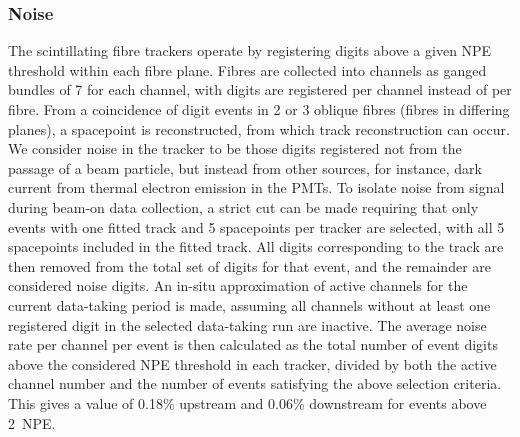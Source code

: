 \subsubsection{Noise}
The scintillating fibre trackers operate by registering digits above a given NPE threshold within each fibre plane. Fibres are collected into channels as ganged bundles of 7 for each channel, with digits are registered per channel instead of per fibre. From a coincidence of digit events in 2 or 3 oblique fibres (fibres in differing planes), a spacepoint is reconstructed, from which track reconstruction can occur. We consider noise in the tracker to be those digits registered not from the passage of a beam particle, but instead from other sources, for instance, dark current from thermal electron emission in the PMTs. To isolate noise from signal during beam-on data collection, a strict cut can be made requiring that only events with one fitted track and 5 spacepoints per tracker are selected, with all 5 spacepoints included in the fitted track. All digits corresponding to the track are then removed from the total set of digits for that event, and the remainder are considered noise digits. An in-situ approximation of active channels for the current data-taking period is made, assuming all channels without at least one registered digit in the selected data-taking run are inactive. The average noise rate per channel per event is then calculated as the total number of event digits above the considered NPE threshold in each tracker, divided by both the active channel number and the number of events satisfying the above selection criteria. This gives a value of 0.18\% upstream and 0.06\% downstream for events above 2~NPE. 

